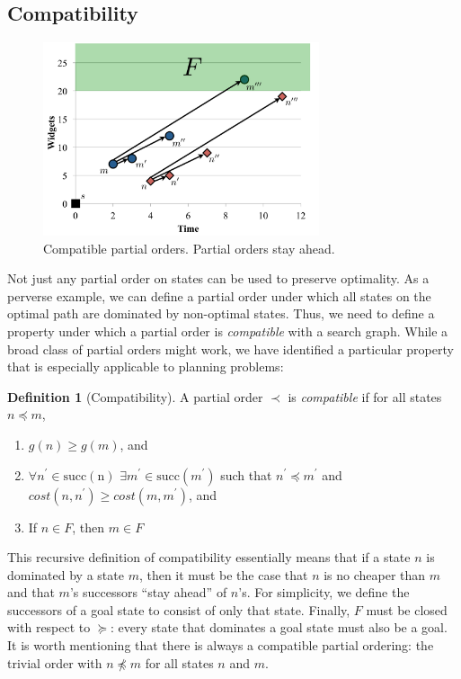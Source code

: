 \documentclass[letterpaper]{article}
\theoremstyle{plain} \newtheorem{theorem}{Theorem} \newtheorem{proposition}{Proposition} \newtheorem{lemma}{Lemma}
\theoremstyle{definition} \newtheorem{definition}{Definition} \newtheorem{conjecture}{Conjecture} \newtheorem*{example}{Example}
\theoremstyle{remark} \newtheorem*{remark}{Remark} \newtheorem*{note}{Note} \newtheorem{case}{Case}
\begin{document}
\subsection{Compatibility}
\begin{figure}
	\begin{center}
	\includegraphics[width=3.2in]{compatibility.pdf}
\end{center}
  \caption{Compatible partial orders. Partial orders stay ahead.}
\end{figure}

Not just any partial order on states can be used to preserve optimality. As a perverse
example, we can define a partial order under which all states on the optimal path
are dominated by non-optimal states. Thus, we need to define a property
under which a partial order is \textit{compatible} with a search graph. While
a broad class of partial orders might work, we have identified a particular 
property that is especially applicable to planning problems:

\begin{definition}[Compatibility]
	\label{def-compatibility}
  A partial order $\prec$ is \textit{compatible} if for all states $n \preceq m$,
  \begin{enumerate}
    \item $g(n) \ge g(m)$, and 
    \item $\forall n^\prime \in \mathrm{succ(n)}$ $\exists m^\prime \in
      \mathrm{succ}(m^\prime)$ such that $n^\prime \preceq m^\prime$ and
      $cost(n,n^\prime) \ge cost(m, m^\prime)$, and
    \item If $n \in F$, then $m \in F$
  \end{enumerate}
\end{definition}
This recursive definition of compatibility essentially means that
if a state $n$ is dominated by a state $m$, then it must be the
case that $n$ is no cheaper than $m$ and that $m$'s successors
``stay ahead'' of $n$'s. For simplicity, we define the successors of %
a goal state to consist of only that state. Finally, $F$ must be closed with respect
to $\succeq$: every state that dominates a goal state must also be
a goal. It is worth mentioning that there is always a compatible
partial ordering: the trivial order with $n \npreceq m$ for all
states $n$ and $m$.
\end{document}
